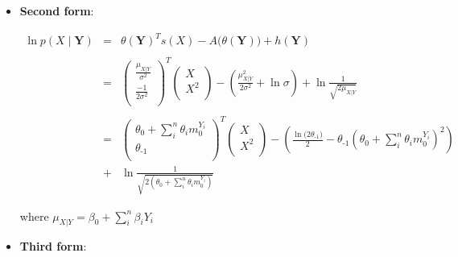 \documentclass[11pt, oneside]{article}   	%
\numberwithin{figure}{section}
\numberwithin{equation}{section}
\numberwithin{table}{section}
\begin{document}
\begin{itemize}
\vspace{0.5in}
\item \textbf{Second form}:

\begin{eqnarray*}
\ln p(X\mid \mathbf{Y}) &=& \theta(\mathbf{Y})^T s(X) - A \big(\theta(\mathbf{Y})\big) + h(\mathbf{Y})\\\\
&=&
\begin{pmatrix}
\frac{\mu_{X|Y}}{\sigma^2}\\
\frac{-1}{2\sigma^2}\\
\end{pmatrix}^T
\begin{pmatrix}
X\\
X^2\\
\end{pmatrix}
- \left(\frac{\mu_{X|Y}^2}{2\sigma^2} + \ln{\sigma}\right) + \ln{\frac{1}{\sqrt{2\mu_{X|Y}}}} \\\\
&=&
\begin{pmatrix}
\theta_0+\sum_i^n\theta_i m_0^{Y_i}\\
\theta_{\mbox{-}1}\\
\end{pmatrix}^T
\begin{pmatrix}
X\\
X^2\\
\end{pmatrix}
- \left(\frac{\ln{(2\theta_{\mbox{-}1}})}{2}-\theta_{\mbox{-}1}\left(\theta_0+\sum_i^n\theta_i m_0^{Y_i}\right)^2 \right) \\
&+&
 \ln{\frac{1}{\sqrt{2(\theta_0+\sum_i^n\theta_i m_0^{Y_i})}}} 
\end{eqnarray*}

where $\mu_{X|Y} = \beta_0+\sum_i^n{\beta_i Y_i}$

\vspace{0.2in}
\item \textbf{Third form}:


\end{itemize}
\end{document}
